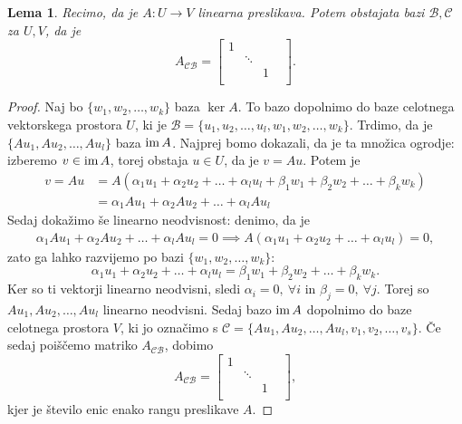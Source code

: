 \documentclass[10pt, a4paper]{article}
\newtheorem{lema}[izr]{Lema}
\newenvironment{noticeC}{%
  \tcolorbox[%
  notitle,
  empty,
  enhanced,  %
  breakable,
  coltext=black, 
  fontupper=\rmfamily,
  parbox=false,
  noparskip,
  sharp corners,
  boxrule=-1pt,  %
  frame hidden,
  left=7pt,  %
  right=7pt,
  top=5pt,
  bottom=5pt,
  before skip=2.5ex plus 2pt,
  after skip=2.5ex plus 2pt,
  overlay unbroken and last={%
  },
  ]}
{\endtcolorbox}
\newenvironment{dokaz}%
  {\begin{noticeC}\begin{proof}}%
  {\end{proof}\end{noticeC}}
\newcommand{\im}{\textup{\text{im}}\,}
\begin{document}
\begin{lema}
    Recimo, da je $A: U \rightarrow V$ linearna preslikava. Potem obstajata bazi $\mathcal{B, C}$ za $U, V$, da je
    $$A_\mathcal{CB} = \begin{bmatrix}
        1 & & & \\
         & \ddots & & \\
         & & 1 & \\
         & & &
    \end{bmatrix}.$$
\end{lema}

\begin{dokaz}
    Naj bo $\{w_1, w_2, \dots, w_k\}$ baza $\ker A$. To bazo dopolnimo do baze celotnega vektorskega prostora $U$, ki je
    $\mathcal{B} = \{u_1, u_2, \dots, u_l, w_1, w_2, \dots, w_k\}.$
    Trdimo, da je $\{Au_1, Au_2, \dots, A u_l\}$ baza $\im A$.
        Najprej bomo dokazali, da je ta množica ogrodje: izberemo $v \in \im A$, torej obstaja $u \in U$, da je $v = Au$.
        Potem je \begin{align*}
            v = Au &= A(\alpha_1 u_1 + \alpha_2 u_2 + \dots + \alpha_l u_l + \beta_1 w_1 + \beta_2 w_2 + \dots + \beta_k w_k)\\
            &= \alpha_1 A u_1 + \alpha_2 A u_2 + \dots + \alpha_l A u_l
        \end{align*}
    Sedaj dokažimo še linearno neodvisnost: denimo, da je
        \begin{align*}
            \alpha_1 A u_1 + \alpha_2 A u_2 + \dots + \alpha_l A u_l = 0 \implies A(\alpha_1 u_1 + \alpha_2 u_2 + \dots + \alpha_l u_l) = 0,
        \end{align*}
        zato ga lahko razvijemo po bazi $\{w_1, w_2, \dots, w_k\}$:
        $$\alpha_1 u_1 + \alpha_2 u_2 + \dots + \alpha_l u_l = \beta_1 w_1 + \beta_2 w_2 + \dots + \beta_k w_k.$$
        Ker so ti vektorji linearno neodvisni, sledi $\alpha_i = 0,\ \forall i$ in $\beta_j = 0,\ \forall j$.
        Torej so $Au_1, Au_2, \dots, Au_l$ linearno neodvisni.
    Sedaj bazo $\im A$ dopolnimo do baze celotnega prostora $V$, ki jo označimo s
    $\mathcal{C} = \{A u_1, A u_2, \dots, A u_l, v_1, v_2, \dots, v_s\}.$
    Če sedaj poiščemo matriko $A_\mathcal{CB}$, dobimo
    \begin{equation*}
        A_\mathcal{CB} = \begin{bmatrix}
            1 & & & \\
            & \ddots & & \\
            & & 1 & \\
            & & &
        \end{bmatrix},
    \end{equation*}
    kjer je število enic enako rangu preslikave $A$.
\end{dokaz}
\end{document}
